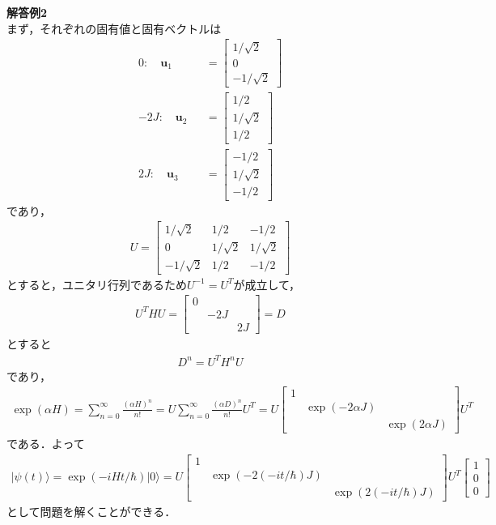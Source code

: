 \documentclass[12pt,dvipdfmx]{jsarticle}
\begin{document}
\textbf{解答例2}\\
まず，それぞれの固有値と固有ベクトルは
\begin{eqnarray}
  0: \quad \bm{u}_1&&=
  \begin{bmatrix}
    1/\sqrt{2}\\
    0\\
    -1/\sqrt{2}
  \end{bmatrix}\\
  -2J: \quad \bm{u}_2&&=
  \begin{bmatrix}
    1/2\\
    1/\sqrt{2}\\
    1/2
  \end{bmatrix}\\
  2J: \quad \bm{u}_3&&=
  \begin{bmatrix}
    -1/2\\
    1/\sqrt{2}\\
    -1/2
  \end{bmatrix}
\end{eqnarray}
であり，
\begin{eqnarray}
  U = 
  \begin{bmatrix}
    1/\sqrt{2} & 1/2 & -1/2\\
    0 & 1/\sqrt{2} & 1/\sqrt{2}\\
    -1/\sqrt{2} & 1/2 & -1/2
  \end{bmatrix}
\end{eqnarray}
とすると，ユニタリ行列であるため$U^{-1}=U^{T}$が成立して，
\begin{eqnarray}
  U^{T}HU =
  \begin{bmatrix}
    0 &  & \\
     & -2J & \\
     & & 2J
  \end{bmatrix}=D
\end{eqnarray}
とすると
\begin{eqnarray}
  D^n = U^{T} H^n U
\end{eqnarray}
であり，
\begin{eqnarray}
  \exp(\alpha H) = \sum_{n=0}^{\infty} \frac{(\alpha H)^n}{n!} = U \sum_{n=0}^{\infty} \frac{(\alpha D)^n}{n!} U^{T} =U
  \begin{bmatrix}
    1 &  & \\
     & \exp(-2\alpha J) & \\
     & & \exp(2\alpha J)
  \end{bmatrix}U^{T}
\end{eqnarray}
である．よって
\begin{eqnarray}
  |\psi(t)\rangle = \exp(-iHt/\hbar)|0\rangle = U
  \begin{bmatrix}
    1 &  & \\
     & \exp(-2(-it/\hbar) J) & \\
     & & \exp(2(-it/\hbar)  J)
  \end{bmatrix}U^{T}
  \begin{bmatrix}
    1 \\
    0\\
    0
  \end{bmatrix}
\end{eqnarray}
として問題を解くことができる．
\end{document}
